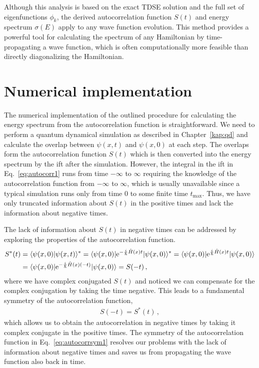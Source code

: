 Although this analysis is based on the exact TDSE solution and the full set of eigenfunctions $\phi_k$, the derived autocorrelation function $S(t)$ and energy spectrum $\sigma(E)$ apply to any wave function evolution. This method provides a powerful tool for calculating the spectrum of any Hamiltonian by time-propagating a wave function, which is often computationally more feasible than directly diagonalizing the Hamiltonian.


\section{Numerical implementation}
\label{sec:autocorr_numap}

The numerical implementation of the outlined procedure for calculating the energy spectrum from the autocorrelation function is straightforward. We need to perform a quantum dynamical simulation as described in Chapter~\ref{kap:qd} and calculate the overlap between $\psi(x,t)$ and $\psi(x,0)$ at each step. The overlaps form the autocorrelation function $S(t)$ which is then converted into the energy spectrum by the \acrlong{ift} after the simulation. However, the integral in the \acrlong{ift} in Eq.~\eqref{eq:autocorr1} runs from time $-\infty$ to $\infty$ requiring the knowledge of the autocorrelation function from $-\infty$ to $\infty$, which is usually unavailable since a typical simulation runs only from time 0 to some finite time $t_\mathrm{max}$. Thus, we have only truncated information about $S(t)$ in the positive times and lack the information about negative times.

The lack of information about $S(t)$ in negative times can be addressed by exploring the properties of the autocorrelation function.
\begin{align}
    S^*(t) &= \langle \psi(x,0) | \psi(x,t) \rangle^* = \langle \psi(x,0) | \mathrm{e}^{-\frac{i}{\hbar}\hat{H}(x)t} |\psi(x,0) \rangle^* = \langle \psi(x,0) | \mathrm{e}^{\frac{i}{\hbar}\hat{H}(x)t} |\psi(x,0) \rangle \notag \\
    &= \langle \psi(x,0) | \mathrm{e}^{-\frac{i}{\hbar}\hat{H}(x)(-t)} |\psi(x,0) \rangle = S(-t) \, ,
    \label{eq:autocorrsym2}
\end{align}
where we have complex conjugated $S(t)$ and noticed we can compensate for the complex conjugation by taking the time negative. This leads to a fundamental symmetry of the autocorrelation function,
\begin{align}
    S(-t) = S^*(t) \, ,
    \label{eq:autocorrsym1}
\end{align}
which allows us to obtain the autocorrelation in negative times by taking it complex conjugate in the positive times. The symmetry of the autocorrelation function in Eq.~\eqref{eq:autocorrsym1} resolves our problems with the lack of information about negative times and saves us from propagating the wave function also back in time.

